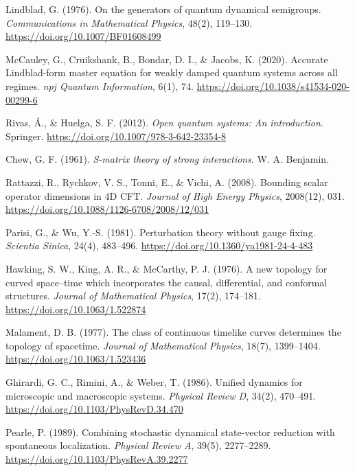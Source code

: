 \documentclass[12pt,a4paper]{article}
\numberwithin{equation}{section}
\begin{document}
\begin{enumerate}[leftmargin=0.5in, itemindent=-0.5in, label={[\arabic*]}]
\item Lindblad, G. (1976). On the generators of quantum dynamical semigroups. \textit{Communications in Mathematical Physics}, 48(2), 119--130. \url{https://doi.org/10.1007/BF01608499}

\item McCauley, G., Cruikshank, B., Bondar, D. I., \& Jacobs, K. (2020). Accurate Lindblad-form master equation for weakly damped quantum systems across all regimes. \textit{npj Quantum Information}, 6(1), 74. \url{https://doi.org/10.1038/s41534-020-00299-6}

\item Rivas, \'A., \& Huelga, S. F. (2012). \textit{Open quantum systems: An introduction}. Springer. \url{https://doi.org/10.1007/978-3-642-23354-8}

\item Chew, G. F. (1961). \textit{S-matrix theory of strong interactions}. W. A. Benjamin.

\item Rattazzi, R., Rychkov, V. S., Tonni, E., \& Vichi, A. (2008). Bounding scalar operator dimensions in 4D CFT. \textit{Journal of High Energy Physics}, 2008(12), 031. \url{https://doi.org/10.1088/1126-6708/2008/12/031}

\item Parisi, G., \& Wu, Y.-S. (1981). Perturbation theory without gauge fixing. \textit{Scientia Sinica}, 24(4), 483--496. \url{https://doi.org/10.1360/ya1981-24-4-483}

\item Hawking, S. W., King, A. R., \& McCarthy, P. J. (1976). A new topology for curved space--time which incorporates the causal, differential, and conformal structures. \textit{Journal of Mathematical Physics}, 17(2), 174--181. \url{https://doi.org/10.1063/1.522874}

\item Malament, D. B. (1977). The class of continuous timelike curves determines the topology of spacetime. \textit{Journal of Mathematical Physics}, 18(7), 1399--1404. \url{https://doi.org/10.1063/1.523436}

\item Ghirardi, G. C., Rimini, A., \& Weber, T. (1986). Unified dynamics for microscopic and macroscopic systems. \textit{Physical Review D}, 34(2), 470--491. \url{https://doi.org/10.1103/PhysRevD.34.470}

\item Pearle, P. (1989). Combining stochastic dynamical state-vector reduction with spontaneous localization. \textit{Physical Review A}, 39(5), 2277--2289. \url{https://doi.org/10.1103/PhysRevA.39.2277}


\end{enumerate}
\end{document}

